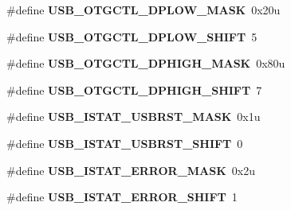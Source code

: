 \begin{DoxyCompactItemize}
\item 
\hypertarget{group___u_s_b___register___masks_gad6a988a0338aa5fcd511f9644b2375eb}{}\#define {\bfseries U\+S\+B\+\_\+\+O\+T\+G\+C\+T\+L\+\_\+\+D\+P\+L\+O\+W\+\_\+\+M\+A\+S\+K}~0x20u\label{group___u_s_b___register___masks_gad6a988a0338aa5fcd511f9644b2375eb}

\item 
\hypertarget{group___u_s_b___register___masks_ga94318731712f5399af57fefe46ac8cec}{}\#define {\bfseries U\+S\+B\+\_\+\+O\+T\+G\+C\+T\+L\+\_\+\+D\+P\+L\+O\+W\+\_\+\+S\+H\+I\+F\+T}~5\label{group___u_s_b___register___masks_ga94318731712f5399af57fefe46ac8cec}

\item 
\hypertarget{group___u_s_b___register___masks_ga58ba9522df4e9a18c7efa0472837c30c}{}\#define {\bfseries U\+S\+B\+\_\+\+O\+T\+G\+C\+T\+L\+\_\+\+D\+P\+H\+I\+G\+H\+\_\+\+M\+A\+S\+K}~0x80u\label{group___u_s_b___register___masks_ga58ba9522df4e9a18c7efa0472837c30c}

\item 
\hypertarget{group___u_s_b___register___masks_ga898efaea515cbbb64826b7685082665f}{}\#define {\bfseries U\+S\+B\+\_\+\+O\+T\+G\+C\+T\+L\+\_\+\+D\+P\+H\+I\+G\+H\+\_\+\+S\+H\+I\+F\+T}~7\label{group___u_s_b___register___masks_ga898efaea515cbbb64826b7685082665f}

\item 
\hypertarget{group___u_s_b___register___masks_gaacafc35a1c208555b284f9f086708686}{}\#define {\bfseries U\+S\+B\+\_\+\+I\+S\+T\+A\+T\+\_\+\+U\+S\+B\+R\+S\+T\+\_\+\+M\+A\+S\+K}~0x1u\label{group___u_s_b___register___masks_gaacafc35a1c208555b284f9f086708686}

\item 
\hypertarget{group___u_s_b___register___masks_gad463e743b6bdd9589a499bf654703da0}{}\#define {\bfseries U\+S\+B\+\_\+\+I\+S\+T\+A\+T\+\_\+\+U\+S\+B\+R\+S\+T\+\_\+\+S\+H\+I\+F\+T}~0\label{group___u_s_b___register___masks_gad463e743b6bdd9589a499bf654703da0}

\item 
\hypertarget{group___u_s_b___register___masks_gaef490eac989ee78a88372bcbf3b029c6}{}\#define {\bfseries U\+S\+B\+\_\+\+I\+S\+T\+A\+T\+\_\+\+E\+R\+R\+O\+R\+\_\+\+M\+A\+S\+K}~0x2u\label{group___u_s_b___register___masks_gaef490eac989ee78a88372bcbf3b029c6}

\item 
\hypertarget{group___u_s_b___register___masks_gaa4afff6c8a78b6b44f3e314dd4746892}{}\#define {\bfseries U\+S\+B\+\_\+\+I\+S\+T\+A\+T\+\_\+\+E\+R\+R\+O\+R\+\_\+\+S\+H\+I\+F\+T}~1\label{group___u_s_b___register___masks_gaa4afff6c8a78b6b44f3e314dd4746892}


\end{DoxyCompactItemize}
